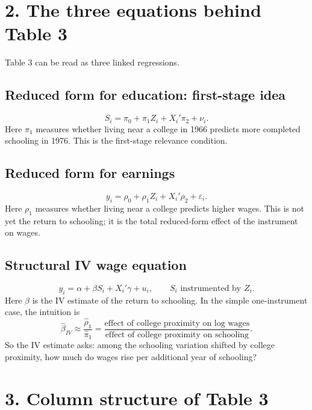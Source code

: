 \documentclass[11pt,a4paper]{article}
\begin{document}
\section*{2. The three equations behind Table 3}

Table 3 can be read as three linked regressions.

\subsection*{Reduced form for education: first-stage idea}
\[
    S_i = \pi_0 + \pi_1 Z_i + X_i'\pi_2 + \nu_i.
\]
Here \(\pi_1\) measures whether living near a college in 1966 predicts more completed schooling in 1976. This is the first-stage relevance condition.

\subsection*{Reduced form for earnings}
\[
    y_i = \rho_0 + \rho_1 Z_i + X_i'\rho_2 + \varepsilon_i.
\]
Here \(\rho_1\) measures whether living near a college predicts higher wages. This is not yet the return to schooling; it is the total reduced-form effect of the instrument on wages.

\subsection*{Structural IV wage equation}
\[
    y_i = \alpha + \beta S_i + X_i'\gamma + u_i,
    \qquad S_i \text{ instrumented by } Z_i.
\]
Here \(\beta\) is the IV estimate of the return to schooling. In the simple one-instrument case, the intuition is
\[
    \widehat{\beta}_{IV}
    \approx
    \frac{\widehat{\rho}_1}{\widehat{\pi}_1}
    =
    \frac{\text{effect of college proximity on log wages}}
         {\text{effect of college proximity on schooling}}.
\]
So the IV estimate asks: among the schooling variation shifted by college proximity, how much do wages rise per additional year of schooling?

\section*{3. Column structure of Table 3}
\end{document}
